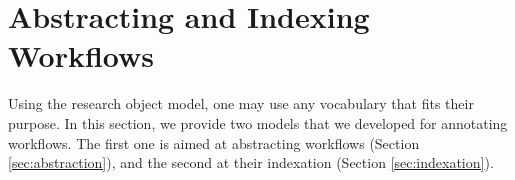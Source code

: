 \section{Abstracting and Indexing Workflows}
\label{sec:abstract-indexing}

Using the research object model, one may use any vocabulary that fits their purpose. In this section, we provide two models that we developed for annotating workflows. The first one is aimed at abstracting workflows (Section \ref{sec:abstraction}), and the second at their indexation (Section \ref{sec:indexation}).